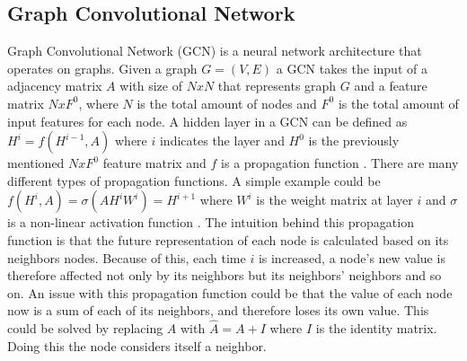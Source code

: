 \subsection{Graph Convolutional Network}
Graph Convolutional Network (GCN) is a neural network architecture that operates on graphs.
Given a graph $G = (V,E)$ a GCN takes the input of a adjacency
matrix $A$ with size of $N x N$ that represents graph $G$ and a feature matrix $N x F^0$, where $N$ is the total amount of nodes and $F^0$ is the total amount of input features for each node.
A hidden layer in a GCN can be defined as $H^i = f(H^{i-1}, A)$ where $i$ indicates the layer and $H^0$ is the previously mentioned $N x F^0$ feature matrix and $f$ is a propagation function \cite{Deep-Learning-on-Graphs-with-GCN}.
There are many different types of propagation functions.
A simple example could be $f(H^i, A) = \sigma(AH^iW^i) = H^{i+1}$ where $W^i$ is the weight matrix at layer $i$ and $\sigma$ is a non-linear activation function \cite{Deep-Learning-on-Graphs-with-GCN}.
The intuition behind this propagation function is that the future representation of each node is calculated based on its neighbors nodes.
Because of this, each time $i$ is increased, a node's new value is therefore affected not only by its neighbors but its neighbors' neighbors and so on.
An issue with this propagation function could be that the value of each node now is a sum of each of its neighbors, and therefore loses its own value.
This could be solved by replacing $A$ with $\hat{A} = A + I$ where $I$ is the identity matrix.
Doing this the node considers itself a neighbor.
